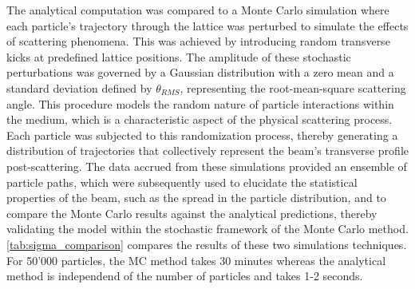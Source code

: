 \documentclass[a4paper,
               biblatex,     %
               ]{jacow}
\begin{document}
The analytical computation was compared to a Monte Carlo simulation where each particle's trajectory through the lattice was perturbed to simulate the effects of scattering phenomena. This was achieved by introducing random transverse kicks at predefined lattice positions. The amplitude of these stochastic perturbations was governed by a Gaussian distribution with a zero mean and a standard deviation defined by $\theta_{RMS}$, representing the root-mean-square scattering angle. This procedure models the random nature of particle interactions within the medium, which is a characteristic aspect of the physical scattering process. Each particle was subjected to this randomization process, thereby generating a distribution of trajectories that collectively represent the beam's transverse profile post-scattering. The data accrued from these simulations provided an ensemble of particle paths, which were subsequently used to elucidate the statistical properties of the beam, such as the spread in the particle distribution, and to compare the Monte Carlo results against the analytical predictions, thereby validating the model within the stochastic framework of the Monte Carlo method. \ref{tab:sigma_comparison} compares the results of these two simulations techniques. For 50'000 particles, the MC method takes 30 minutes whereas the analytical method is independend of the number of particles and takes 1-2 seconds.

\begin{table}[ht]
\centering
{}
\caption{Sigma values for analytical and Monte Carlo methods in non-scattered and scattered particle distributions.}
\label{tab:sigma_comparison}
\end{table}


\end{document}
